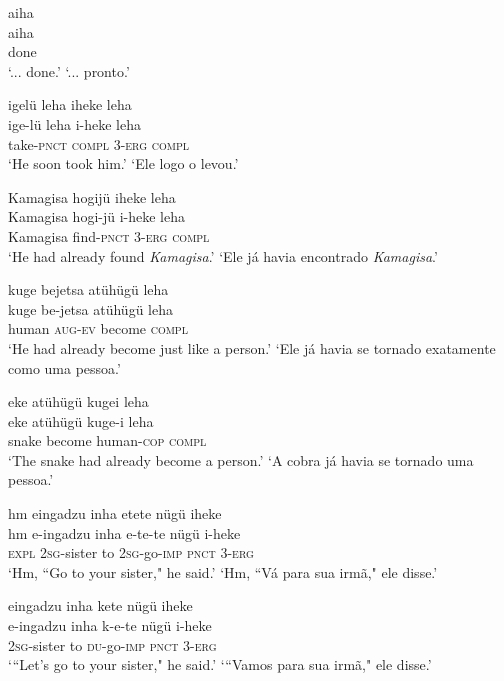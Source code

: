 \documentclass[output=paper,
modfonts,nonflat
]{langsci/langscibook}
\begin{document}
\ea  aiha\\[.3em]
\gll aiha\\
     done\\
\glt ‘... done.’
\glt ‘... pronto.’
\z

\ea  igelü leha iheke leha\\[.3em]
\gll ige-lü leha i-heke leha\\
     take-\textsc{pnct} \textsc{compl} 3-\textsc{erg} \textsc{compl}\\
\glt ‘He soon took him.’
\glt ‘Ele logo o levou.’
\z

\ea  Kamagisa hogijü iheke leha\\[.3em]
\gll Kamagisa hogi-jü i-heke leha\\
     Kamagisa find-\textsc{pnct} 3-\textsc{erg} \textsc{compl}\\
\glt ‘He had already found \textit{Kamagisa}.’
\glt ‘Ele já havia encontrado \textit{Kamagisa}.’
\z

\ea  kuge bejetsa atühügü leha\\[.3em]
\gll kuge be-jetsa atühügü leha\\
     human \textsc{aug}-\textsc{ev} become \textsc{compl}\\
\glt ‘He had already become just like a person.’
\glt ‘Ele já havia se tornado exatamente como uma pessoa.’
\z

\ea  eke atühügü kugei leha\\[.3em]
\gll eke atühügü kuge-i leha\\
     snake become human-\textsc{cop} \textsc{compl}\\
\glt ‘The snake had already become a person.’
\glt ‘A cobra já havia se tornado uma pessoa.’
\z

\ea  hm eingadzu inha etete nügü iheke\\[.3em]
\gll hm e-ingadzu inha e-te-te nügü i-heke\\
     \textsc{expl} \textsc{2sg}-sister to \textsc{2sg}-go-\textsc{imp} \textsc{pnct} 3-\textsc{erg}\\
\glt ‘Hm, “Go to your sister," he said.’
\glt ‘Hm, “Vá para sua irmã," ele disse.’
\z

\ea  eingadzu inha kete nügü iheke\\[.3em]
\gll e-ingadzu inha k-e-te nügü i-heke\\
     \textsc{2sg}-sister to \textsc{du}-go-\textsc{imp} \textsc{pnct} 3-\textsc{erg}\\
\glt ‘“Let's go to your sister," he said.’
\glt ‘“Vamos para sua irmã," ele disse.’
\z
\end{document}
